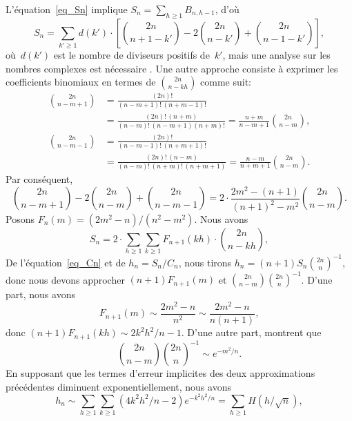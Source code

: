 L'équation~\eqref{eq_Sn} implique \(S_{n} = \sum_{h \geqslant 1}
B_{n,h-1}\), d'où
\begin{equation*}
S_{n} = \sum_{k' \geqslant 1}d(k') \cdot
         \left[\binom{2n}{n+1-k'} - 2\binom{2n}{n-k'}
         + \binom{2n}{n-1-k'}\right],
\end{equation*}
où~\(d(k')\) est le nombre de diviseurs positifs de~\(k'\), mais une
analyse sur les nombres complexes est nécessaire
\citep{KnuthdeBruijnRice_1972,FlajoletGourdonDumas_1995}. Une autre
approche consiste à exprimer les coefficients binomiaux en termes de
\(\binom{2n}{n-kh}\) comme suit:
\begin{align*}
\binom{2n}{n-m+1} &= \frac{(2n)!}{(n-m+1)!\,(n+m-1)!}\\
                  &= \frac{(2n)!\,(n+m)}{(n-m)!\,(n-m+1)(n+m)!} 
                   = \frac{n+m}{n-m+1}\binom{2n}{n-m},\\
\binom{2n}{n-m-1} &= \frac{(2n)!}{(n-m-1)!\,(n+m+1)!}\\
                  &= \frac{(2n)!\,(n-m)}{(n-m)!\,(n+m)!\,(n+m+1)}
                   = \frac{n-m}{n+m+1}\binom{2n}{n-m}.
\end{align*}
Par conséquent,
\begin{equation*}
\binom{2n}{n-m+1} - 2\binom{2n}{n-m} + \binom{2n}{n-m-1}
= 2 \cdot \frac{2m^2-(n+1)}{(n+1)^2-m^2}\binom{2n}{n-m}.
\end{equation*}
Posons \(F_n(m) = (2m^2-n)/(n^2-m^2)\). Nous avons
\begin{equation*}
S_{n} = 2 \cdot \sum_{h \geqslant 1}\sum_{k \geqslant 1} F_{n+1}(kh)
\cdot \binom{2n}{n-kh},
\end{equation*}
De l'équation~\eqref{eq_Cn} et de \(h_n = S_n/C_n\), nous tirons
\(h_{n} = (n+1)S_{n}{\binom{2n}{n}}^{-1}\), donc nous devons approcher
\((n+1)F_{n+1}(m)\) et \(\binom{2n}{n-m}\binom{2n}{n}^{-1}\). D'une
part, nous avons
\begin{equation*}
F_{n+1}(m) \sim \frac{2m^2-n}{n^2} \sim \frac{2m^2-n}{n(n+1)},
\end{equation*}
donc \((n+1)F_{n+1}(kh) \sim 2k^2h^2\!/n-1\). D'une autre part,
\citet*[4.6, 4.8]{SedgewickFlajolet_1996} montrent que
\begin{equation*}
\binom{2n}{n-m}{\binom{2n}{n}}^{-1} \sim e^{-m^2\!/n}.
\end{equation*}
En supposant que les termes d'erreur implicites des deux
approximations précédentes diminuent exponentiellement, nous avons
\begin{equation*}
h_{n} \sim \sum_{h \geqslant 1}\sum_{k \geqslant 1}
(4k^2h^2\!/n - 2)e^{-k^2h^2\!/n}
= \sum_{h \geqslant 1}H(h/\!\sqrt{n}), 
\end{equation*}
